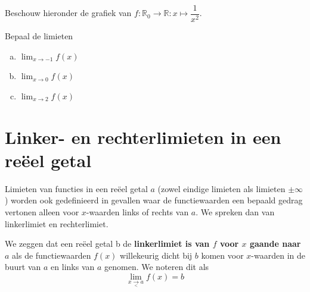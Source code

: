 \documentclass[12pt]{article}
\newenvironment{definitie}
{
  \vspace{0.4cm}
  \begin{mdframed}[nobreak=true,frametitle={Definitie}]
  }{%
  \end{mdframed}
}
\begin{document}
\begin{oefening}
  Beschouw hieronder de grafiek van $f:\mathbb{R}_0\to\mathbb{R}:x\mapsto\dfrac{1}{x^2}$.
  \begin{center}
  \end{center}
  Bepaal de limieten
  \begin{enumerate}[(a)]
  \item $\displaystyle\lim_{x\to-1} f(x)$
  \item $\displaystyle\lim_{x\to0} f(x)$
  \item $\displaystyle\lim_{x\to2} f(x)$
  \end{enumerate}
\end{oefening}

\pagebreak
\section{Linker- en rechterlimieten in een reëel getal}

Limieten van functies in een reëel getal $a$ (zowel eindige limieten als limieten $\pm\infty$) worden ook gedefinieerd in gevallen waar de functiewaarden een bepaald gedrag vertonen alleen voor $x$-waarden links of rechts van $a$. We spreken dan van linkerlimiet en rechterlimiet.

\begin{definitie}
  We zeggen dat een reëel getal b de {\bf linkerlimiet is van $f$ voor $x$ gaande naar $a$} als de functiewaarden $f(x)$ willekeurig dicht bij $b$ komen voor $x$-waarden in de buurt van $a$ en links van $a$ genomen. We noteren dit als
  $$\lim_{x\underset{<}{\to}a}f(x)=b$$
\end{definitie}
\end{document}
